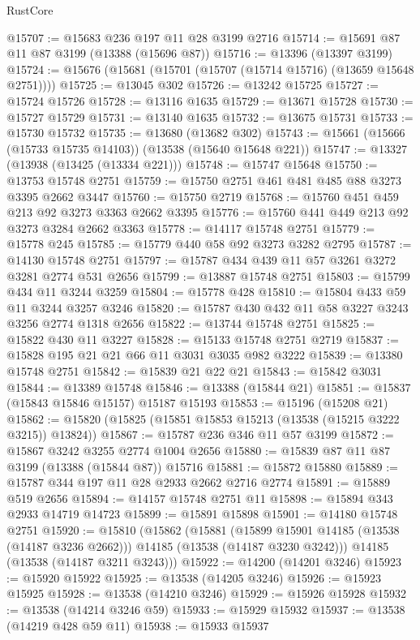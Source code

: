 \begin{lexlean}{RustCore}
\begin{coremodule}
@15707 := @15683 @236 @197 @11 @28 @3199 @2716
@15714 := @15691 @87 @11 @87 @3199 (@13388 (@15696 @87))
@15716 := @13396 (@13397 @3199)
@15724 := @15676 (@15681 (@15701 (@15707 (@15714 @15716) (@13659 @15648 @2751))))
@15725 := @13045 @302
@15726 := @13242 @15725
@15727 := @15724 @15726
@15728 := @13116 @1635
@15729 := @13671 @15728
@15730 := @15727 @15729
@15731 := @13140 @1635
@15732 := @13675 @15731
@15733 := @15730 @15732
@15735 := @13680 (@13682 @302)
@15743 := @15661 (@15666 (@15733 @15735 @14103)) (@13538 (@15640 @15648 @221))
@15747 := @13327 (@13938 (@13425 (@13334 @221)))
@15748 := @15747 @15648
@15750 := @13753 @15748 @2751
@15759 := @15750 @2751 @461 @481 @485 @88 @3273 @3395 @2662 @3447
@15760 := @15750 @2719
@15768 := @15760 @451 @459 @213 @92 @3273 @3363 @2662 @3395
@15776 := @15760 @441 @449 @213 @92 @3273 @3284 @2662 @3363
@15778 := @14117 @15748 @2751
@15779 := @15778 @245
@15785 := @15779 @440 @58 @92 @3273 @3282 @2795
@15787 := @14130 @15748 @2751
@15797 := @15787 @434 @439 @11 @57 @3261 @3272 @3281 @2774 @531 @2656
@15799 := @13887 @15748 @2751
@15803 := @15799 @434 @11 @3244 @3259
@15804 := @15778 @428
@15810 := @15804 @433 @59 @11 @3244 @3257 @3246
@15820 := @15787 @430 @432 @11 @58 @3227 @3243 @3256 @2774 @1318 @2656
@15822 := @13744 @15748 @2751
@15825 := @15822 @430 @11 @3227
@15828 := @15133 @15748 @2751 @2719
@15837 := @15828 @195 @21 @21 @66 @11 @3031 @3035 @982 @3222
@15839 := @13380 @15748 @2751
@15842 := @15839 @21 @22 @21
@15843 := @15842 @3031
@15844 := @13389 @15748
@15846 := @13388 (@15844 @21)
@15851 := @15837 (@15843 @15846 @15157) @15187 @15193
@15853 := @15196 (@15208 @21)
@15862 := @15820 (@15825 (@15851 @15853 @15213 (@13538 (@15215 @3222 @3215)) @13824))
@15867 := @15787 @236 @346 @11 @57 @3199
@15872 := @15867 @3242 @3255 @2774 @1004 @2656
@15880 := @15839 @87 @11 @87 @3199 (@13388 (@15844 @87)) @15716
@15881 := @15872 @15880
@15889 := @15787 @344 @197 @11 @28 @2933 @2662 @2716 @2774
@15891 := @15889 @519 @2656
@15894 := @14157 @15748 @2751 @11
@15898 := @15894 @343 @2933 @14719 @14723
@15899 := @15891 @15898
@15901 := @14180 @15748 @2751
@15920 := @15810
    (@15862
      (@15881
        (@15899 @15901 @14185 (@13538 (@14187 @3236 @2662)))
        @14185
        (@13538 (@14187 @3230 @3242)))
      @14185
      (@13538 (@14187 @3211 @3243)))
@15922 := @14200 (@14201 @3246)
@15923 := @15920 @15922
@15925 := @13538 (@14205 @3246)
@15926 := @15923 @15925
@15928 := @13538 (@14210 @3246)
@15929 := @15926 @15928
@15932 := @13538 (@14214 @3246 @59)
@15933 := @15929 @15932
@15937 := @13538 (@14219 @428 @59 @11)
@15938 := @15933 @15937

\end{coremodule}
\end{lexlean}
